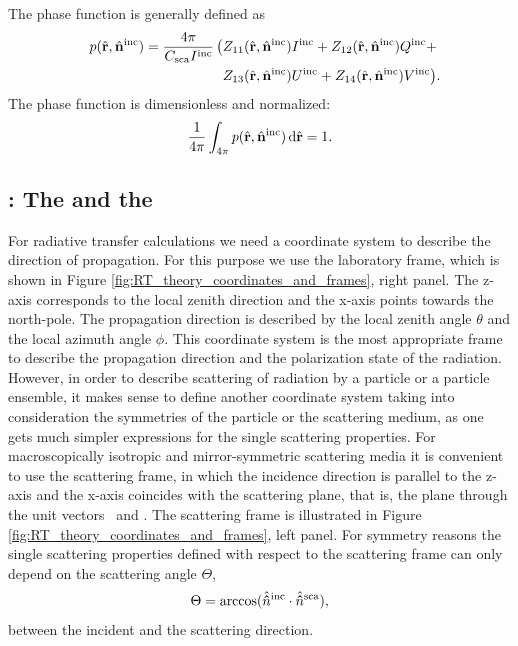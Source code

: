 The phase function is generally defined as
\begin{eqnarray}\label{eq:rtetheory:phase_function}
  p(\hat{\VctStl{r}}, \hat{\VctStl{n}}^{\inc}) =
    \frac{4\pi}{C_{\sca} I^{\inc}} \, \bigl( &
         Z_{11}(\hat{\VctStl{r}}, \hat{\VctStl{n}}^{\inc})I^{\inc}
       + Z_{12}(\hat{\VctStl{r}}, \hat{\VctStl{n}}^{\inc})Q^{\inc} \rlap{${}+$} \\
    &    Z_{13}(\hat{\VctStl{r}}, \hat{\VctStl{n}}^{\inc})U^{\inc}
       + Z_{14}(\hat{\VctStl{r}}, \hat{\VctStl{n}}^{\inc})V^{\inc} \rlap{$\bigr)$.}
 \end{eqnarray}
The phase function is dimensionless and normalized:
\begin{equation}
  \frac{1}{4\pi}\int_{4\pi} 
  p(\hat{\mathbf{r}}, \hat{\mathbf{n}}^{\mathrm{inc}}) \,\mathrm{d}\hat{\mathbf{r}} = 1.
\end{equation}


\subsection[Coordinate systems]{: The
   and the  }
\label{sec:rtetheory:particle_coordinate_sytems}

For radiative transfer calculations we need a coordinate system to
describe the direction of propagation. For this purpose we use the
laboratory frame, which is shown in
Figure \ref{fig:RT_theory_coordinates_and_frames}, right panel. The z-axis
corresponds to the local zenith direction and the x-axis points towards the
north-pole. The propagation direction is described by the local zenith
angle $\theta$ and the local azimuth angle $\phi$. This coordinate
system is the most appropriate frame to describe the propagation
direction and the polarization state of the radiation. However, in
order to describe scattering of radiation by a particle or a particle
ensemble, it makes sense to define another coordinate system taking
into consideration the symmetries of the particle or the scattering
medium, as one gets much simpler expressions for the single scattering
properties. For macroscopically isotropic and mirror-symmetric
scattering media it is convenient to use the scattering frame, in
which the incidence direction is parallel to the z-axis and the x-axis
coincides with the scattering plane, that is, the plane through the
unit vectors \ and . The
scattering frame is illustrated in
Figure \ref{fig:RT_theory_coordinates_and_frames}, left panel. For symmetry
reasons the single scattering properties defined with respect to the scattering
frame can only depend on the scattering angle $\Theta$,
\begin{equation}
  \label{eq:scat_angle}
  \Theta=\arccos(\hat{{\bf \hat{n}}}^{\mathrm{inc}} \cdot {\hat{\ensuremath{{\bf \hat{n}}}}^{\mathrm{sca}}}),
\end{equation}
between the incident and the scattering direction.


